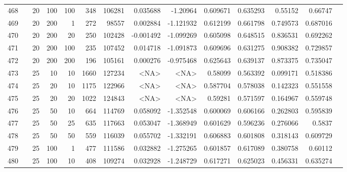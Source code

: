 \begin{longtable}{llrrrrrrrrrrrr}
		468 & &           20 &               100 &          100 &          348 &     106281 &  0.035688 &  -1.20964 &  0.609671 &    0.635293 &        0.55152 &   0.66747 \\
		469 & &           20 &               200 &            1 &          272 &      98557 &  0.002884 & -1.121932 &  0.612199 &    0.661798 &       0.749573 &  0.687016 \\
		470 & &           20 &               200 &           20 &          250 &     102428 & -0.001492 & -1.099269 &  0.605098 &    0.648515 &       0.836531 &  0.692262 \\
		471 & &           20 &               200 &          100 &          235 &     107452 &  0.014718 & -1.091873 &  0.609696 &    0.631275 &       0.908382 &  0.729857 \\
		472 & &           20 &               200 &          200 &          196 &     105161 &  0.000276 & -0.975468 &  0.625643 &    0.639137 &       0.873375 &  0.735047 \\
		473 & &           25 &                10 &           10 &           1660 &     127234 &      <NA> &      <NA> &   0.58099 &    0.563392 &       0.099171 &  0.518386 \\
		474 & &           25 &                20 &           10 &           1175 &     122966 &      <NA> &      <NA> &  0.587704 &    0.578038 &       0.142323 &  0.551558 \\
		475 & &           25 &                20 &           20 &           1022 &     124843 &      <NA> &      <NA> &   0.59281 &    0.571597 &       0.164967 &  0.559748 \\
		476 & &           25 &                50 &           10 &          664 &     114769 &  0.058092 & -1.352548 &  0.600069 &    0.606166 &       0.262803 &  0.595839 \\
		477 & &           25 &                50 &           25 &          635 &     117663 &  0.053047 & -1.368949 &  0.601629 &    0.596236 &       0.276066 &    0.5837 \\
		478 & &           25 &                50 &           50 &          559 &     116039 &  0.055702 & -1.332191 &  0.606883 &    0.601808 &       0.318143 &  0.609729 \\
		479 & &           25 &               100 &            1 &          477 &     111586 &  0.032882 & -1.275265 &  0.601857 &    0.617089 &       0.380758 &   0.60112 \\
		480 & &           25 &               100 &           10 &          408 &     109274 &  0.032928 & -1.248729 &  0.617271 &    0.625023 &       0.456331 &  0.635274 \\

\end{longtable}
